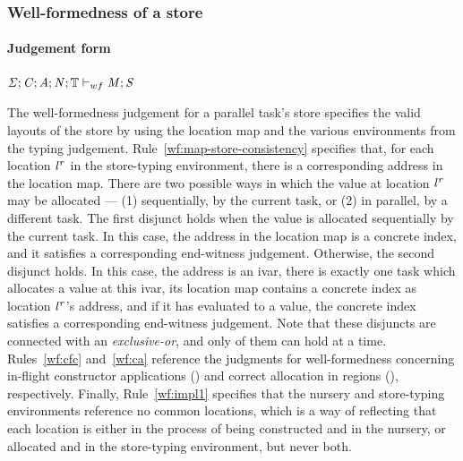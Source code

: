 \subsubsection{Well-formedness of a store}
\label{sec:well-formedness}

\paragraph{Judgement form}

$\mathit{\Sigma};\mathit{C};\mathit{A};\mathit{N};\mathbb{T} \vdash_{wf} \mathit{M};\mathit{S}$

The well-formedness judgement for a parallel task's
store specifies the valid layouts of the store by using the location
map and the various environments from the typing judgement.
%
Rule~\ref{wf:map-store-consistency} specifies that, for each location ${\mathit{l}}^{\mathit{r}}$
in the store-typing environment,
there is a corresponding address in the location map.
%
There are two possible ways in which the value at location ${\mathit{l}}^{\mathit{r}}$
may be allocated --- (1) sequentially, by the current task, or
(2) in parallel, by a different task.
%
The first disjunct holds when the value is allocated sequentially by the current task.
%
In this case, the address in the location map is a concrete index, 
and it satisfies a corresponding end-witness judgement.
%
Otherwise, the second disjunct holds.
%
In this case, the address is an ivar,
there is exactly one task which allocates a value at this ivar,
its location map contains a concrete index as location ${\mathit{l}}^{\mathit{r}}$'s address,
and if it has evaluated to a value, the concrete index satisfies
a corresponding end-witness judgement.
%
Note that these disjuncts are connected with an {\em exclusive-or}, and only of them
can hold at a time.
%
%
Rules~\ref{wf:cfc} and~\ref{wf:ca} reference the judgments for well-formedness concerning
in-flight constructor applications () and correct allocation in
regions (), respectively.
%
Finally, Rule~\ref{wf:impl1} specifies that the nursery and store-typing environments reference
no common locations, which is a way of reflecting that each location is either in the process
of being constructed and in the nursery, or allocated and in the store-typing environment, but
never both.


